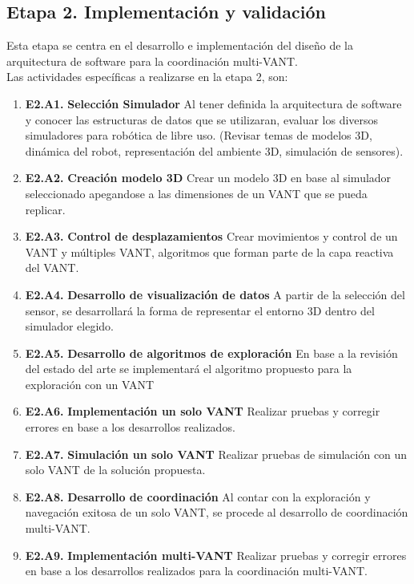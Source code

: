 \documentclass[11pt,epsf,times]{article}
\begin{document}
  \subsection*{Etapa 2. Implementaci\'{o}n y validaci\'{o}n}
  
  Esta etapa se centra en el desarrollo e implementaci\'{o}n del dise\~{n}o de la arquitectura de software para la coordinaci\'{o}n multi-VANT.\\
  
  Las actividades espec\'{i}ficas a realizarse en la etapa 2, son:

  \begin{enumerate}
  \item[] \textbf{E2.A1.} \textbf{Selecci\'{o}n Simulador} Al tener definida la arquitectura de software y conocer las estructuras de datos que se utilizaran, evaluar los diversos simuladores para rob\'{o}tica de libre uso. (Revisar temas de modelos 3D, din\'{a}mica del robot, representaci\'{o}n del ambiente 3D, simulaci\'{o}n de sensores). 
  \item[] \textbf{E2.A2.} \textbf{Creaci\'{o}n modelo 3D} Crear un modelo 3D en base al simulador seleccionado apegandose a las dimensiones de un VANT que se pueda replicar.
  \item[] \textbf{E2.A3.} \textbf{Control de desplazamientos} Crear movimientos y control de un VANT y m\'{u}ltiples VANT, algoritmos que forman parte de la capa reactiva del VANT.
  \item[] \textbf{E2.A4.} \textbf{Desarrollo de visualizaci\'{o}n de datos} A partir de la selecci\'{o}n del sensor, se desarrollar\'{a} la forma de representar el entorno 3D dentro del simulador elegido.
  \item[] \textbf{E2.A5.} \textbf{Desarrollo de algoritmos de exploraci\'{o}n} En base a la revisi\'{o}n del estado del arte se implementar\'{a} el algoritmo propuesto para la exploraci\'{o}n con un VANT
  \item[] \textbf{E2.A6.} \textbf{Implementaci\'{o}n un solo VANT} Realizar pruebas y corregir errores en base a los desarrollos realizados.
  \item[] \textbf{E2.A7.} \textbf{Simulaci\'{o}n un solo VANT} Realizar pruebas de simulaci\'{o}n con un solo VANT de la soluci\'{o}n propuesta.
  \item[] \textbf{E2.A8.} \textbf{Desarrollo de coordinaci\'{o}n} Al contar con la exploraci\'{o}n y navegaci\'{o}n exitosa de un solo VANT, se procede al desarrollo de coordinaci\'{o}n multi-VANT.
  \item[] \textbf{E2.A9.} \textbf{Implementaci\'{o}n multi-VANT} Realizar pruebas y corregir errores en base a los desarrollos realizados para la coordinaci\'{o}n multi-VANT.

\end{enumerate}
\end{document}
